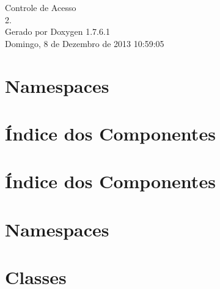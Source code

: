 \documentclass[a4paper]{book}
\begin{document}
\hypersetup{pageanchor=false,citecolor=blue}
\begin{titlepage}
\vspace*{7cm}
\begin{center}
{\Large \-Controle de \-Acesso \\[1ex]\large 2. }\\
\vspace*{1cm}
{\large \-Gerado por Doxygen 1.7.6.1}\\
\vspace*{0.5cm}
{\small Domingo, 8 de Dezembro de 2013 10:59:05}\\
\end{center}
\end{titlepage}
\clearemptydoublepage
{}
\tableofcontents
\clearemptydoublepage
{}
\hypersetup{pageanchor=true,citecolor=blue}
\chapter{\-Namespaces}

\chapter{Índice dos \-Componentes}

\chapter{Índice dos \-Componentes}

\chapter{\-Namespaces}

\chapter{\-Classes}

















\printindex
\end{document}
